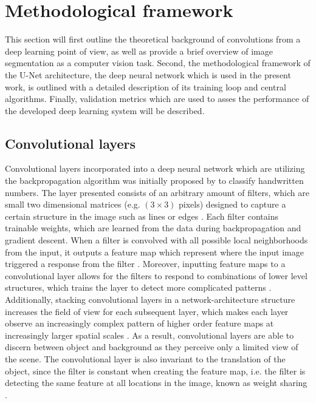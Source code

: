\documentclass[../main/thesis.tex]{subfiles}
\begin{document}
\section{Methodological framework}
This section will first outline the theoretical background of convolutions from a deep learning point of view, as well as provide a brief overview of image segmentation as a computer vision task. Second, the methodological framework of the U-Net architecture, the deep neural network which is used in the present work, is outlined with a detailed description of its training loop and central algorithms. Finally, validation metrics which are used to asses the performance of the developed deep learning system will be described.

\subsection{Convolutional layers}
\label{sec:convolutional-layer}
Convolutional layers incorporated into a deep neural network which are utilizing the backpropagation algorithm \citep{Rumelhart1986} was initially proposed by \citet{LeCun1989} to classify handwritten numbers. The layer \citet{LeCun1989} presented consists of an arbitrary amount of filters, which are small two dimensional matrices (e.g. $(3 \times 3)$ pixels) designed to capture a certain structure in the image such as lines or edges . Each filter contains trainable weights, which are learned from the data during backpropagation \citep{LeCun1989} and gradient descent. When a filter is convolved with all possible local neighborhoods from the input, it outputs a feature map which represent where the input image triggered a response from the filter \citep{Zeiler2010}. Moreover, inputting feature maps to a convolutional layer allows for the filters to respond to combinations of lower level structures, which trains the layer to detect more complicated patterns \citep{Fukushima1980}. Additionally, stacking convolutional layers in a network-architecture structure increases the field of view for each subsequent layer, which makes each layer observe an increasingly complex pattern of higher order feature maps at increasingly larger spatial scales \citep{Fukushima1980}. As a result, convolutional layers are able to discern between object and background as they perceive only a limited view of the scene. The convolutional layer is also invariant to the translation of the object, since the filter is constant when creating the feature map, i.e. the filter is detecting the same feature at all locations in the image, known as weight sharing \citep{LeCun1989}.
\end{document}
